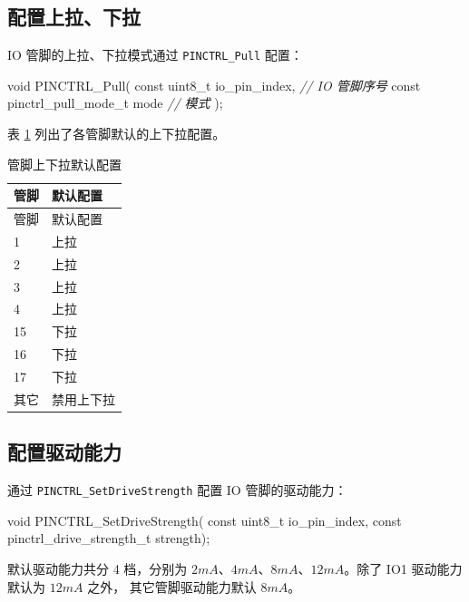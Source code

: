 \documentclass[
  12pt,
]{book}
\newenvironment{Shaded}{\begin{snugshade}}{\end{snugshade}}
\newcommand{\CommentTok}[1]{\textcolor[rgb]{0.56,0.35,0.01}{\textit{#1}}}
\newcommand{\DataTypeTok}[1]{\textcolor[rgb]{0.13,0.29,0.53}{#1}}
\newcommand{\NormalTok}[1]{#1}
\begin{document}
\hypertarget{ux914dux7f6eux4e0aux62c9ux4e0bux62c9}{%
\subsection{配置上拉、下拉}\label{ux914dux7f6eux4e0aux62c9ux4e0bux62c9}}

IO 管脚的上拉、下拉模式通过 \texttt{PINCTRL\_Pull} 配置：

\begin{Shaded}
\begin{Highlighting}[]
\DataTypeTok{void}\NormalTok{ PINCTRL_Pull(}
  \DataTypeTok{const} \DataTypeTok{uint8_t}\NormalTok{ io_pin_index,     }\CommentTok{// IO 管脚序号}
  \DataTypeTok{const}\NormalTok{ pinctrl_pull_mode_t mode  }\CommentTok{// 模式}
\NormalTok{  );}
\end{Highlighting}
\end{Shaded}

表 \ref{tab:ch-pinctrl-pull-default} 列出了各管脚默认的上下拉配置。

\begin{longtable}[]{@{}ll@{}}
\caption{\label{tab:ch-pinctrl-pull-default} 管脚上下拉默认配置}\tabularnewline
\toprule
管脚 & 默认配置\tabularnewline
\midrule
\endfirsthead
\toprule
管脚 & 默认配置\tabularnewline
\midrule
\endhead
1 & 上拉\tabularnewline
2 & 上拉\tabularnewline
3 & 上拉\tabularnewline
4 & 上拉\tabularnewline
15 & 下拉\tabularnewline
16 & 下拉\tabularnewline
17 & 下拉\tabularnewline
其它 & 禁用上下拉\tabularnewline
\bottomrule
\end{longtable}

\hypertarget{ux914dux7f6eux9a71ux52a8ux80fdux529b}{%
\subsection{配置驱动能力}\label{ux914dux7f6eux9a71ux52a8ux80fdux529b}}

通过 \texttt{PINCTRL\_SetDriveStrength} 配置 IO 管脚的驱动能力：

\begin{Shaded}
\begin{Highlighting}[]
\DataTypeTok{void}\NormalTok{ PINCTRL_SetDriveStrength(}
  \DataTypeTok{const} \DataTypeTok{uint8_t}\NormalTok{ io_pin_index,}
  \DataTypeTok{const}\NormalTok{ pinctrl_drive_strength_t strength);}
\end{Highlighting}
\end{Shaded}

默认驱动能力共分 4 档，分别为 \(2mA\)、\(4mA\)、\(8mA\)、\(12mA\)。除了 IO1 驱动能力默认为 \(12mA\) 之外，
其它管脚驱动能力默认 \(8mA\)。
\end{document}

